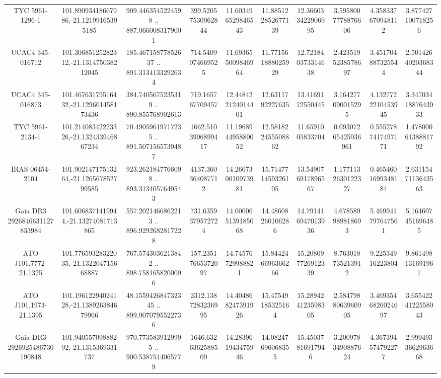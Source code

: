 \begin{table}
\begin{tabular}{cccccccccc}
TYC 5961-1296-1 & 101.89093418667986,-21.12199165395185 & 909.4463545224598 .. 887.0660083179001 & 399.52057530962844 & 11.603496529846543 & 11.885122852677139 & 12.366033422906995 & 3.5958007778876606 & 4.358337670948112 & 3.877427100718256 \\
UCAC4 345-016712 & 101.30685125282312,-21.131475038212045 & 185.46715877852637 .. 891.3134133292634 & 714.5409074669525 & 11.693655009846964 & 11.771561888025929 & 12.721840373314638 & 2.4235195238578697 & 3.451704887325544 & 2.5014264020368344 \\
UCAC4 345-016873 & 101.46763179516432,-21.129601458173436 & 384.7405675235319 .. 890.855768902613 & 719.165767709457 & 12.448422124014401 & 12.6311792227635 & 13.4169172550445 & 3.164277090015295 & 4.1327722210453945 & 3.3470341887643933 \\
TYC 5961-2134-1 & 101.21408342223326,-21.132433946867234 & 70.49059619717235 .. 891.5071565739487 & 1662.5103906899417 & 11.196894495880052 & 12.581822455508862 & 11.6591005833704 & 0.09307265425936961 & 0.5552787417497171 & 1.4780006138881792 \\
IRAS 06454-2104 & 101.90214717513264,-21.126567852799585 & 923.2621847766098 .. 893.3134057649543 & 4137.360364087712 & 14.260730010973981 & 15.714771459326105 & 13.549076917896567 & 1.1771132630122327 & 0.4654601699348184 & 2.6311547113643563 \\
Gaia DR3 2926846631127833984 & 101.6068371419944,-21.13274081713865 & 557.2021466862213 .. 896.9292682817228 & 731.6359379572724 & 14.000065139185068 & 14.48608260106286 & 14.791416947013936 & 4.678589989818693 & 5.469941797647561 & 5.164607451696485 \\
ATO J101.7772-21.1325 & 101.77659328322035,-21.132204715668887 & 767.5743036213842 .. 898.7581658200096 & 157.23517665372097 & 14.74576729988821 & 15.844246696366266 & 15.208097726912339 & 8.763018735213912 & 9.22534916223804 & 9.861498131691967 \\
ATO J101.1973-21.1395 & 101.19612294024128,-21.138926384679966 & 48.155942684732345 .. 899.9070795522736 & 2312.1387283236995 & 14.404868247391926 & 15.47549185325164 & 15.289424123598305 & 2.5847988063960905 & 3.4693546826024697 & 3.6554224122558043 \\
Gaia DR3 2926925486730190848 & 101.94055709888292,-21.1315369331737 & 970.7735839129995 .. 900.5387544065779 & 1646.6326362588509 & 14.283961943475946 & 14.08247696068355 & 15.45037816917946 & 3.2009783490887624 & 4.367394574792277 & 2.9994933662963668 \\

\end{tabular}
\end{table}
